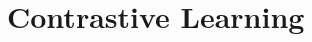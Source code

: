 \documentclass[a4paper, twoside, english]{sapthesis} %
\begin{document}

\section{Contrastive Learning}
\end{document}
